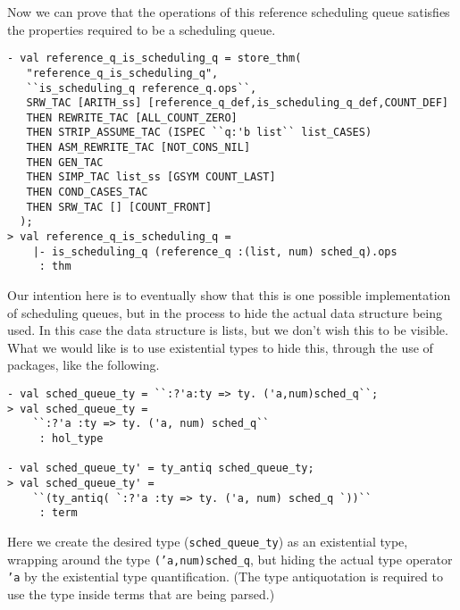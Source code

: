 Now we can prove that the operations of this reference scheduling
queue satisfies the properties required to be a scheduling queue.
\begin{session}
\begin{verbatim}
- val reference_q_is_scheduling_q = store_thm(
   "reference_q_is_scheduling_q",
   ``is_scheduling_q reference_q.ops``,
   SRW_TAC [ARITH_ss] [reference_q_def,is_scheduling_q_def,COUNT_DEF]
   THEN REWRITE_TAC [ALL_COUNT_ZERO]
   THEN STRIP_ASSUME_TAC (ISPEC ``q:'b list`` list_CASES)
   THEN ASM_REWRITE_TAC [NOT_CONS_NIL]
   THEN GEN_TAC
   THEN SIMP_TAC list_ss [GSYM COUNT_LAST]
   THEN COND_CASES_TAC
   THEN SRW_TAC [] [COUNT_FRONT]
  );
> val reference_q_is_scheduling_q =
    |- is_scheduling_q (reference_q :(list, num) sched_q).ops
     : thm
\end{verbatim}
\end{session}

Our intention here is to eventually show that this is one possible
implementation of scheduling queues, but in the process to hide the
actual data structure being used. In this case the data structure is
lists, but we don't wish this to be visible. What we would like is
to use existential types to hide this, through the use of packages,
like the following. 
\begin{session}
\begin{verbatim}
- val sched_queue_ty = ``:?'a:ty => ty. ('a,num)sched_q``;
> val sched_queue_ty =
    ``:?'a :ty => ty. ('a, num) sched_q``
     : hol_type

- val sched_queue_ty' = ty_antiq sched_queue_ty;
> val sched_queue_ty' =
    ``(ty_antiq( `:?'a :ty => ty. ('a, num) sched_q `))``
     : term
\end{verbatim}
\end{session}
Here we create the desired type ({\tt sched\_queue\_ty})
as an existential type, wrapping around the type
{\tt ('a,num)sched\_q}, but hiding the actual type operator {\tt 'a}
by the existential type quantification. 
(The type antiquotation is required to use the type inside terms
that are being parsed.)

